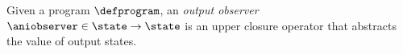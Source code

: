 Given a program $\defprogram$, an \emph{output observer} $\aniobserver\in \state \to \state$ is an upper closure operator that abstracts the value of output states.
